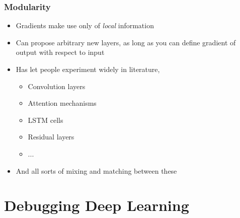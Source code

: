 \documentclass[10pt,mathserif]{beamer}
\begin{document}
\begin{frame}
  \frametitle{Modularity}
  \begin{itemize}
  \item Gradients make use only of \textit{local} information
  \item Can propose arbitrary new layers, as long as you can define gradient of
    output with respect to input
  \item Has let people experiment widely in literature,
    \begin{itemize}
    \item Convolution layers \citep{lecun1995convolutional}
    \item Attention mechanisms \citep{olah2016attention}
    \item LSTM cells \citep{schmidhuber1997long}
    \item Residual layers \citep{he2016deep}
    \item ...
    \end{itemize}
  \item And all sorts of mixing and matching between these
  \end{itemize}
\end{frame}

\section{Debugging Deep Learning}
\end{document}
